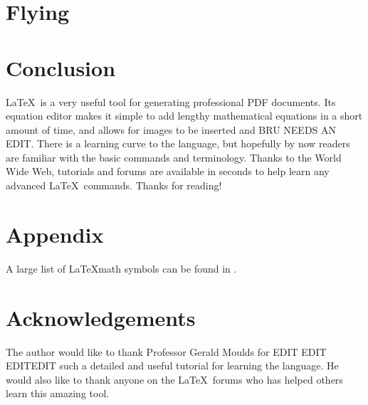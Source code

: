 \documentclass[12pt,journal,compsoc]{IEEEtran}
\begin{document}
\section{Flying}


\section{Conclusion}
\LaTeX\ is a very useful tool for generating professional PDF documents. Its equation editor makes it simple to add lengthy mathematical equations in a short amount of time, and allows for images to be inserted and BRU NEEDS AN EDIT. There is a learning curve to the language, but hopefully by now readers are familiar with the basic commands and terminology. Thanks to the World Wide Web, tutorials and forums are available in seconds to help learn any advanced \LaTeX\ commands. Thanks for reading!

\appendices
\section*{Appendix}
A large list of \LaTeX math symbols can be found in \cite{Symbols}.

\section*{Acknowledgements}
The author would like to thank Professor Gerald Moulds for EDIT EDIT EDITEDIT such a detailed and useful tutorial for learning the language. He would also like to thank anyone on the \LaTeX\ forums who has helped others learn this amazing tool.

\end{document}

